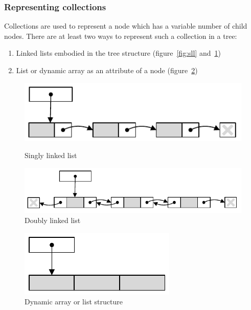 \documentclass[final,a4paper,12pt]{article}
\begin{document}
\subsubsection{Representing collections}
Collections are used to represent a node which has a variable number of child nodes. There are at least two ways to represent such a collection in a tree:
\begin{enumerate}
	\item Linked lists embodied in the tree structure (figure~\ref{fig:sll} and~\ref{fig:dll})
	\item List or dynamic array as an attribute of a node (figure~\ref{fig:list})
\end{enumerate}

\begin{figure}[ht]
	\begin{minipage}[b]{0.45\linewidth}
		\centering
		\includegraphics[width=\textwidth]{sll}
		\caption{Singly linked list}
		\label{fig:sll}
	\end{minipage}
	\hspace{0.5cm}
	\begin{minipage}[b]{0.45\linewidth}
		\centering
		\includegraphics[width=\textwidth]{dll}
		\caption{Doubly linked list}
		\label{fig:dll}
	\end{minipage}
\end{figure}
\begin{figure}[h]
	\centering
	\includegraphics{list}
	\caption{Dynamic array or list structure}
	\label{fig:list}
\end{figure}
\end{document}
